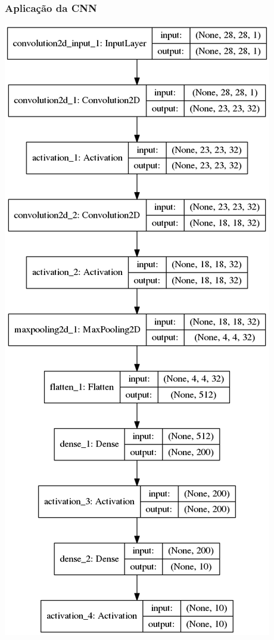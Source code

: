 \documentclass[tikz,10pt]{beamer}
\begin{document}
\begin{frame}
	\frametitle{Aplicação da CNN}
	\centering
	\includegraphics[height=.8\paperheight]{images/resultados/default/model}
\end{frame}
\end{document}
